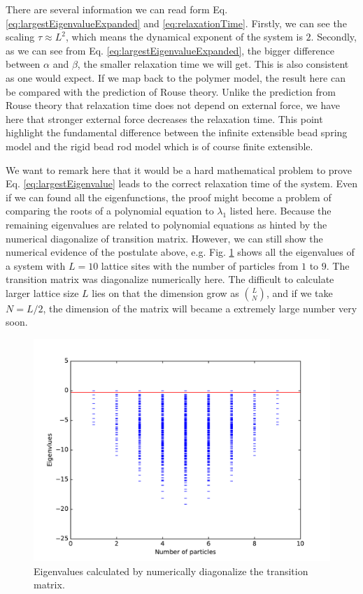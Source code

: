 \documentclass[12pt,a4paper]{article}
\begin{document}
There are several information we can read form Eq.
\eqref{eq:largestEigenvalueExpanded} and \eqref{eq:relaxationTime}. Firstly, we
can see the scaling $\tau \approx L^2$, which means the dynamical exponent of
the system is $2$. Secondly, as we can see from Eq.
\eqref{eq:largestEigenvalueExpanded}, the bigger difference between $\alpha$
and $\beta$, the smaller relaxation time we will get. This is also consistent
as one would expect. If we map back to the polymer model, the result here can
be compared with the prediction of Rouse theory. Unlike the prediction
from Rouse theory that relaxation time does not depend on external force, we
have here that stronger external force decreases the relaxation time. This
point highlight the fundamental difference between the infinite extensible bead
spring model and the rigid bead rod model which is of course finite extensible. 

We want to remark here that it would be a hard mathematical problem to prove
Eq. \eqref{eq:largestEigenvalue} leads to the correct relaxation time of the
system. Even if we can found all the eigenfunctions, the proof might become a
problem of comparing the roots of a polynomial equation to $\lambda_1$ listed
here. Because the remaining eigenvalues are related to polynomial equations as
hinted by the numerical diagonalize of transition matrix. However, we can still
show the numerical evidence of the postulate above, e.g. Fig.
\ref{fig:eigenvalues} shows all the eigenvalues of a system with $L=10$
lattice sites with the number of particles from $1$ to $9$. The transition
matrix was diagonalize numerically here. The difficult to calculate larger
lattice size $L$ lies on that the dimension grow as $\binom{L}{N}$, and if we
take $N=L/2$, the dimension of the matrix will became a extremely large number
very soon. 

\begin{figure}[htpb]
    \centering
    \includegraphics[width=0.8\linewidth]{eigenvalues}
    \caption{Eigenvalues calculated by numerically diagonalize the transition
        matrix.}
    \label{fig:eigenvalues}
\end{figure}
\end{document}
